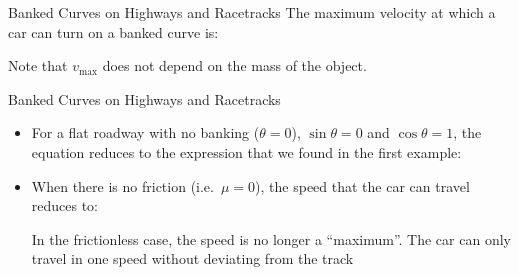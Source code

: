 \documentclass[12pt,compress,aspectratio=169]{beamer}
\begin{document}
\begin{frame}{Banked Curves on Highways and Racetracks}
  The maximum velocity at which a car can turn on a banked curve is:

  
  Note that $v_\text{max}$ does not depend on the mass of the object.
\end{frame}



\begin{frame}{Banked Curves on Highways and Racetracks}

  \begin{itemize}
  \item For a flat roadway with no banking ($\theta=0$), $\sin\theta=0$ and
    $\cos\theta=1$, the equation reduces to the expression that we found in
    the first example:



  \item When there is no friction (i.e.\ $\mu=0$), the speed that the car can
    travel reduces to:


    In the frictionless case, the speed is no longer a ``maximum''. The car
    can only travel in one speed without deviating from the track
  \end{itemize}
\end{frame}
\end{document}

